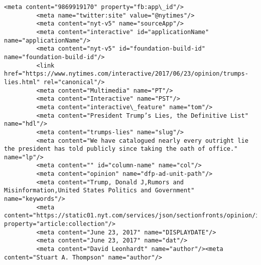 \documentclass[11pt]{article}
\begin{document}
\begin{Verbatim}[commandchars=\\\{\}]
         <meta content="9869919170" property="fb:app\_id"/>
         <meta name="twitter:site" value="@nytimes"/>
         <meta content="nyt-v5" name="sourceApp"/>
         <meta content="interactive" id="applicationName" name="applicationName"/>
         <meta content="nyt-v5" id="foundation-build-id" name="foundation-build-id"/>
         <link href="https://www.nytimes.com/interactive/2017/06/23/opinion/trumps-lies.html" rel="canonical"/>
         <meta content="Multimedia" name="PT"/>
         <meta content="Interactive" name="PST"/>
         <meta content="interactive\_feature" name="tom"/>
         <meta content="President Trump’s Lies, the Definitive List" name="hdl"/>
         <meta content="trumps-lies" name="slug"/>
         <meta content="We have catalogued nearly every outright lie the president has told publicly since taking the oath of office." name="lp"/>
         <meta content="" id="column-name" name="col"/>
         <meta content="opinion" name="dfp-ad-unit-path"/>
         <meta content="Trump, Donald J,Rumors and Misinformation,United States Politics and Government" name="keywords"/>
         <meta content="https://static01.nyt.com/services/json/sectionfronts/opinion/index.jsonp" property="article:collection"/>
         <meta content="June 23, 2017" name="DISPLAYDATE"/>
         <meta content="June 23, 2017" name="dat"/>
         <meta content="David Leonhardt" name="author"/><meta content="Stuart A. Thompson" name="author"/>

\end{Verbatim}
\end{document}
